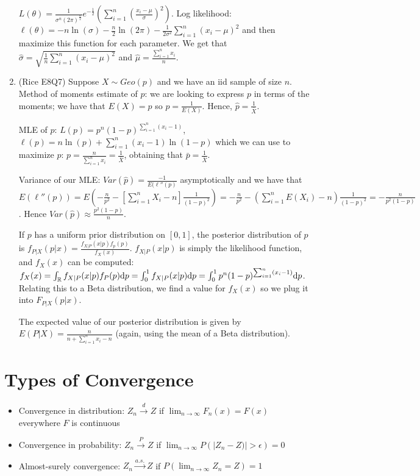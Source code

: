 \documentclass[letterpaper, 8pt]{extarticle}
\begin{document}
\begin{multicols*}{3}
\begin{enumerate}[label=\alph*), wide, labelwidth=0pt, labelindent=0pt]
		$L(\theta)=\frac{1}{\sigma^n(2\pi)^\frac{n}{2}}e^{-\frac{1}{2}}\left(\sum_{i=1}^n\left(\frac{x_i-\mu}{\sigma}\right)^2\right)$. Log likelihood: $\ell(\theta)=-n\ln(\sigma)-\frac{n}{2}\ln(2\pi)-\frac{1}{2\sigma^2}\sum_{i=1}^n(x_i-\mu)^2$ and then maximize this function for each parameter. We get that $\hat\sigma=\sqrt{\frac{1}{n}\sum_{i=1}^n(x_i-\mu)^2}$ and $\hat\mu=\frac{\sum_{i=1}^nx_i}{n}$.
		
		\item (Rice E8Q7) Suppose $X\sim Geo(p)$ and we have an iid sample of size $n$. Method of moments estimate of $p$: we are looking to express $p$ in terms of the moments; we have that $E(X)=p$ so $p=\frac{1}{E(X)}$. Hence, $\hat p=\frac{1}{\bar X}$.
		
		MLE of $p$: $L(p)=p^n(1-p)^{\sum_{i=1}^n(x_i-1)}$, $\ell(p)=n\ln(p)+\sum_{i=1}^n(x_i-1)\ln(1-p)$ which we can use to maximize $p$: $p=\frac{n}{\sum_{i=1}^nx_i}=\frac{1}{\bar X}$, obtaining that $\bar p=\frac{1}{\bar X}$.
		
		Variance of our MLE: $Var(\hat p)=\frac{-1}{E(\ell''(p)}$ asymptotically and we have that $E(\ell''(p))=E\left(-\frac{n}{p^2}-\left[\sum_{i=1}^nX_i-n\right]\frac{1}{(1-p)^2}\right)=-\frac{n}{p^2}-\left(\sum_{i=1}^nE(X_i)-n\right)\frac{1}{(1-p)^2}=-\frac{n}{p^2(1-p)}$. Hence $Var(\hat p)\approx\frac{p^2(1-p)}{n}$.
		
		If $p$ has a uniform prior distribution on $[0,1]$, the posterior distribution of $p$ is $f_{P|X}(p|x)=\frac{f_{X|P}(x|p)f_p(p)}{f_X(x)}$. $f_{X|P}(x|p)$ is simply the likelihood function, and $f_X(x)$ can be computed: $f_X(x)=\int_\mathbb R f_{X|P}(x|p)f_P(p)\dd p=\int_0^1f_{X|P}(x|p)\dd p=\int_0^1p^n(1-p)^{\sum_{i=1}^n(x_i-1)}\dd p$. Relating this to a Beta distribution, we find a value for $f_X(x)$ so we plug it into $F_{P|X}(p|x)$.
		
		The expected value of our posterior distribution is given by $E(P|X)=\frac{n}{n+\sum_{i=1}^nx_i-n}$ (again, using the mean of a Beta distribution).
	\end{enumerate}
	
	\newpage
	\section{Types of Convergence}
	\begin{itemize}
		\item Convergence in distribution: $Z_n\overset{d}{\to}Z$ if $\displaystyle\lim_{n\to\infty}F_n(x)=F(x)$ everywhere $F$ is continuous
		\item Convergence in probability: $Z_n\overset{P}{\to}Z$ if $\displaystyle\lim_{n\to\infty}P(|Z_n-Z)|>\epsilon)=0$
		\item Almost-surely convergence: $Z_n\overset{a.s.}{\to}Z$ if $P(\displaystyle\lim_{n\to\infty}Z_n=Z)=1$
	\end{itemize}

\end{multicols*}
\end{document}

